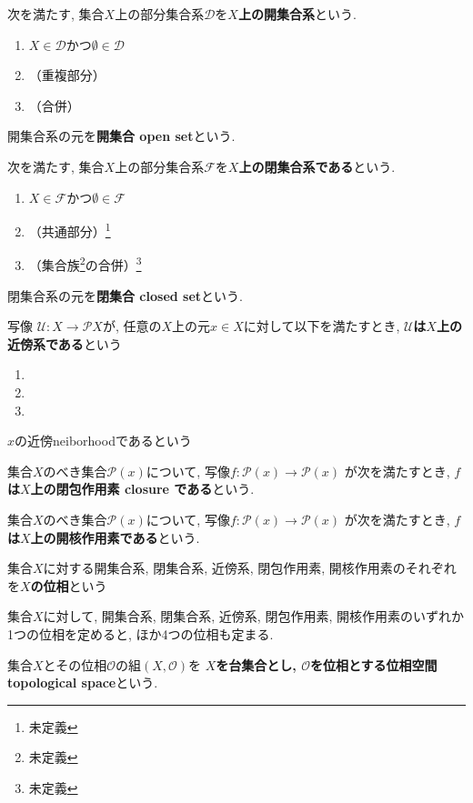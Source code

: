 \begin{Def}
次を満たす, 集合$X$上の部分集合系$\mathscr{D}$を{\bf $X$上の開集合系}という.
\begin{enumerate}
\item $X\in\mathscr{D}$かつ$\emptyset\in\mathscr{D}$
\item （重複部分）
\item （合併）
\end{enumerate}
\end{Def}
\begin{Def}
開集合系の元を{\bf 開集合 open set}という.
\end{Def}
\begin{Def}
次を満たす, 集合$X$上の部分集合系$\mathcal{F}$を{\bf $X$上の閉集合系である}という.
\begin{enumerate}
\item $X\in\mathscr{F}$かつ$\emptyset\in\mathscr{F}$
\item （共通部分）\footnote{未定義}
\item （集合族\footnote{未定義}の合併）\footnote{未定義}
\end{enumerate}
\end{Def}
\begin{Def}
閉集合系の元を{\bf 閉集合 closed set}という.
\end{Def}
\begin{Def}
写像
$\mathscr{U}:X\rightarrow\mathcal{P}X$が, 任意の$X$上の元$x\in X$に対して以下を満たすとき,
{\bf $\mathscr{U}$は$X$上の近傍系である}という
\begin{enumerate}
\item
\item
\item
\end{enumerate}
\end{Def}
\begin{Def}
$x$の近傍neiborhoodであるという
\end{Def}
\begin{Def}
集合$X$のべき集合$\mathscr{P}(x)$について, 写像$f:\mathscr{P}(x)\rightarrow\mathscr{P}(x)$
が次を満たすとき,
{\bf $f$は$X$上の閉包作用素 closure である}という.
\end{Def}
\begin{Def}
集合$X$のべき集合$\mathscr{P}(x)$について, 写像$f:\mathscr{P}(x)\rightarrow\mathscr{P}(x)$
が次を満たすとき,
{\bf $f$は$X$上の開核作用素である}という.
\end{Def}
\begin{Def}
集合$X$に対する開集合系, 閉集合系, 近傍系, 閉包作用素, 開核作用素のそれぞれを{\bf $X$の位相}という
\end{Def}
\begin{Prop}
集合$X$に対して, 開集合系, 閉集合系, 近傍系, 閉包作用素, 開核作用素のいずれか1つの位相を定めると, ほか4つの位相も定まる. 
\end{Prop}
\begin{Def}
集合$X$とその位相$\mathcal{O}$の組$(X,\mathcal{O})$を
{\bf $X$を台集合とし, $\mathcal{O}$を位相とする位相空間 topological space}という.
\end{Def}

